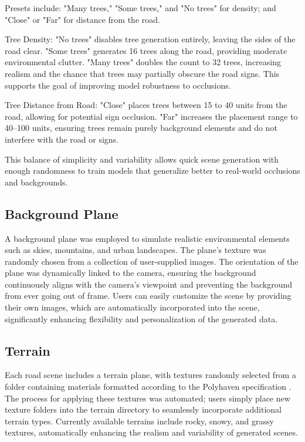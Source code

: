 \documentclass[journal]{IEEEtran}
\begin{document}
Presets include: "Many trees," "Some trees," and "No trees" for density; and "Close" or "Far" for distance from the road.

Tree Density:
"No trees" disables tree generation entirely, leaving the sides of the road clear.
"Some trees" generates 16 trees along the road, providing moderate environmental clutter.
"Many trees" doubles the count to 32 trees, increasing realism and the chance that trees may partially obscure the road signs. This supports the goal of improving model robustness to occlusions.

Tree Distance from Road:
"Close" places trees between 15 to 40 units from the road, allowing for potential sign occlusion.
"Far" increases the placement range to 40–100 units, ensuring trees remain purely background elements and do not interfere with the road or signs.

This balance of simplicity and variability allows quick scene generation with enough randomness to train models that generalize better to real-world occlusions and backgrounds.

\subsection{Background Plane} A background plane was employed to simulate realistic environmental elements such as skies, mountains, and urban landscapes. The plane’s texture was randomly chosen from a collection of user-supplied images. The orientation of the plane was dynamically linked to the camera, ensuring the background continuously aligns with the camera's viewpoint and preventing the background from ever going out of frame. Users can easily customize the scene by providing their own images, which are automatically incorporated into the scene, significantly enhancing flexibility and personalization of the generated data.

\subsection{Terrain} Each road scene includes a terrain plane, with textures randomly selected from a folder containing materials formatted according to the Polyhaven specification \cite{polyhaven}. The process for applying these textures was automated; users simply place new texture folders into the terrain directory to seamlessly incorporate additional terrain types. Currently available terrains include rocky, snowy, and grassy textures, automatically enhancing the realism and variability of generated scenes.
\end{document}
